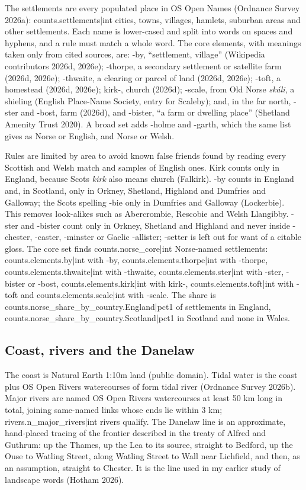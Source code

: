 \documentclass[11pt,a4paper]{article}
\begin{document}
The settlements are every populated place in OS Open Names (Ordnance Survey 2026a): {{counts.settlements|int}} cities, towns, villages, hamlets, suburban areas and other settlements. Each name is lower-cased and split into words on spaces and hyphens, and a rule must match a whole word. The core elements, with meanings taken only from cited sources, are: -by, ``settlement, village'' (Wikipedia contributors 2026d, 2026e); -thorpe, a secondary settlement or satellite farm (2026d, 2026e); -thwaite, a clearing or parcel of land (2026d, 2026e); -toft, a homestead (2026d, 2026e); kirk-, church (2026d); -scale, from Old Norse \textit{sk\'ali}, a shieling (English Place-Name Society, entry for Scaleby); and, in the far north, -ster and -bost, farm (2026d), and -bister, ``a farm or dwelling place'' (Shetland Amenity Trust 2020). A broad set adds -holme and -garth, which the same list gives as Norse or English, and Norse or Welsh.

Rules are limited by area to avoid known false friends found by reading every Scottish and Welsh match and samples of English ones. Kirk counts only in England, because Scots \textit{kirk} also means church (Falkirk). -by counts in England and, in Scotland, only in Orkney, Shetland, Highland and Dumfries and Galloway; the Scots spelling -bie only in Dumfries and Galloway (Lockerbie). This removes look-alikes such as Abercrombie, Rescobie and Welsh Llangibby. -ster and -bister count only in Orkney, Shetland and Highland and never inside -chester, -caster, -minster or Gaelic -allister; -setter is left out for want of a citable gloss. The core set finds {{counts.norse_core|int}} Norse-named settlements: {{counts.elements.by|int}} with -by, {{counts.elements.thorpe|int}} with -thorpe, {{counts.elements.thwaite|int}} with -thwaite, {{counts.elements.ster|int}} with -ster, -bister or -bost, {{counts.elements.kirk|int}} with kirk-, {{counts.elements.toft|int}} with -toft and {{counts.elements.scale|int}} with -scale. The share is {{counts.norse_share_by_country.England|pct1}} of settlements in England, {{counts.norse_share_by_country.Scotland|pct1}} in Scotland and none in Wales.

\subsection{Coast, rivers and the Danelaw}

The coast is Natural Earth 1:10m land (public domain). Tidal water is the coast plus OS Open Rivers watercourses of form tidal river (Ordnance Survey 2026b). Major rivers are named OS Open Rivers watercourses at least 50 km long in total, joining same-named links whose ends lie within 3 km; {{rivers.n_major_rivers|int}} rivers qualify. The Danelaw line is an approximate, hand-placed tracing of the frontier described in the treaty of Alfred and Guthrum: up the Thames, up the Lea to its source, straight to Bedford, up the Ouse to Watling Street, along Watling Street to Wall near Lichfield, and then, as an assumption, straight to Chester. It is the line used in my earlier study of landscape words (Hotham 2026).
\end{document}
